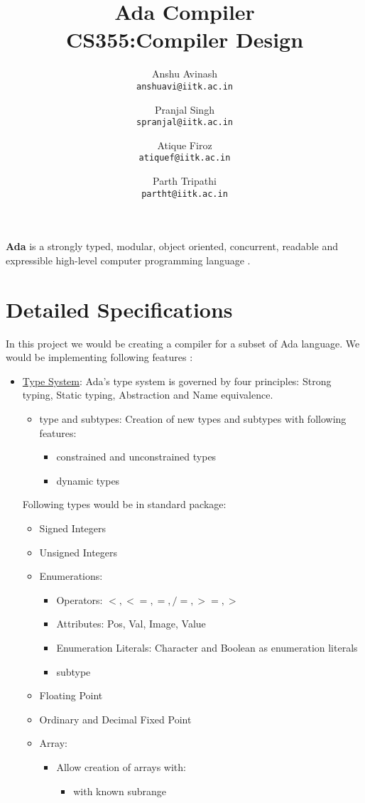 \documentclass{article}
\title{
Ada Compiler \\
CS355:Compiler Design
}
\author{
Anshu Avinash\\
\texttt{anshuavi@iitk.ac.in}
\and
Pranjal Singh\\
\texttt{spranjal@iitk.ac.in}
\and
Atique Firoz\\
\texttt{atiquef@iitk.ac.in}
\and
Parth Tripathi\\
\texttt{partht@iitk.ac.in}
}
\begin{document}
\maketitle
\textbf{Ada} is a strongly typed, modular, object oriented, concurrent, readable and expressible high-level computer programming language \cite{AdaIC}.
\section{Detailed Specifications}
In this project we would be creating a compiler for a subset of Ada language. We would be implementing following features \cite{Wiki}:
\begin{itemize}
	\item \uline{Type System}: Ada's type system is governed by four principles: Strong typing, Static typing, Abstraction and Name equivalence.
	\begin{itemize}
		\item type and subtypes: Creation of new types and subtypes with following features:
		\begin{itemize}
			\item constrained and unconstrained types
			\item dynamic types
		\end{itemize}
	\end{itemize}
	Following types would be in standard package:
	\begin{itemize}
		\item Signed Integers
		\item Unsigned Integers
		\item Enumerations:
			\begin{itemize}
				\item Operators: $<,<=,=,/=,>=,>$
				\item Attributes: Pos, Val, Image, Value
				\item Enumeration Literals: Character and Boolean as enumeration literals
				\item subtype
			\end{itemize}
		\item Floating Point
		\item Ordinary and Decimal Fixed Point
		\item Array:
		\begin{itemize}
		\item Allow creation of arrays with:
			\begin{itemize}
				\item with known subrange

\end{itemize}
\end{itemize}
\end{itemize}
\end{itemize}
\end{document}

